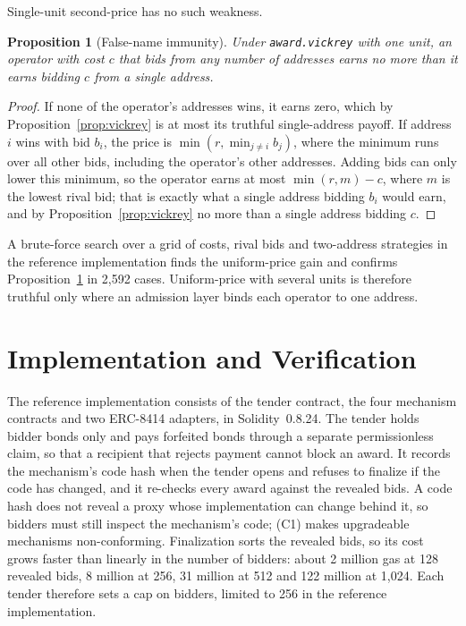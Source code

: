 \documentclass[11pt]{article}
\newtheorem{proposition}{Proposition}
\theoremstyle{definition}
\theoremstyle{remark}
\newcommand{\code}[1]{\texttt{#1}}
\begin{document}
Single-unit second-price has no such weakness.

\begin{proposition}[False-name immunity]
\label{prop:falsename}
Under \code{award.vickrey} with one unit, an operator with cost $c$ that bids from any number of addresses earns no more than it earns bidding $c$ from a single address.
\end{proposition}

\begin{proof}
If none of the operator's addresses wins, it earns zero, which by Proposition~\ref{prop:vickrey} is at most its truthful single-address payoff. If address $i$ wins with bid $b_i$, the price is $\min(r, \min_{j \ne i} b_j)$, where the minimum runs over all other bids, including the operator's other addresses. Adding bids can only lower this minimum, so the operator earns at most $\min(r, m) - c$, where $m$ is the lowest rival bid; that is exactly what a single address bidding $b_i$ would earn, and by Proposition~\ref{prop:vickrey} no more than a single address bidding $c$.
\end{proof}

A brute-force search over a grid of costs, rival bids and two-address strategies in the reference implementation finds the uniform-price gain and confirms Proposition~\ref{prop:falsename} in 2,592 cases. Uniform-price with several units is therefore truthful only where an admission layer binds each operator to one address.

\section{Implementation and Verification}
\label{sec:impl}

The reference implementation \citep{repo} consists of the tender contract, the four mechanism contracts and two ERC-8414 adapters, in Solidity~0.8.24. The tender holds bidder bonds only and pays forfeited bonds through a separate permissionless claim, so that a recipient that rejects payment cannot block an award. It records the mechanism's code hash when the tender opens and refuses to finalize if the code has changed, and it re-checks every award against the revealed bids. A code hash does not reveal a proxy whose implementation can change behind it, so bidders must still inspect the mechanism's code; (C1) makes upgradeable mechanisms non-conforming. Finalization sorts the revealed bids, so its cost grows faster than linearly in the number of bidders: about 2 million gas at 128 revealed bids, 8 million at 256, 31 million at 512 and 122 million at 1,024. Each tender therefore sets a cap on bidders, limited to 256 in the reference implementation.
\end{document}
